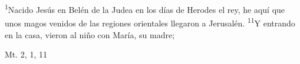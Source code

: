 \documentclass[../../rosario.tex]{subfiles}
\begin{document}
    \textsuperscript{1}Nacido Jesús en Belén de la Judea en los días de Herodes el rey, he aquí que unos magos venidos de las regiones orientales llegaron a Jerusalén.
    \textsuperscript{11}Y entrando en la casa, vieron al niño con María, su madre;
    \begin{flushright}
    Mt. 2, 1, 11        
    \end{flushright}
\end{document}

